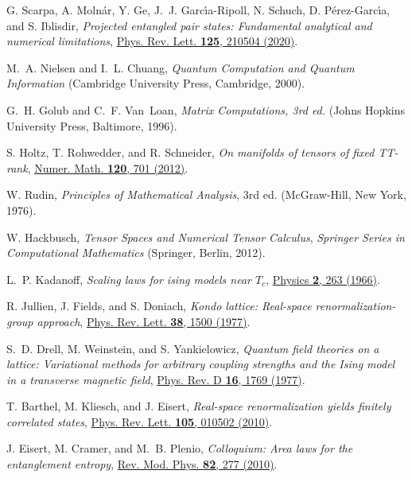 \documentclass[english,11pt,aps,pra,onecolumn,tightenlines,groupedaddress,superscriptaddress,notitlepage,floatfix,fleqn]{revtex4-1}
\begin{document}
\begin{thebibliography}{10}
G. Scarpa, A. Moln\'ar, Y. Ge, J.~J. Garc\'{\i}a-Ripoll, N. Schuch, D.
  P\'erez-Garc\'{\i}a, and S. Iblisdir, {\em Projected entangled pair states:
  Fundamental analytical and numerical limitations},
  \href{https://doi.org/10.1103/PhysRevLett.125.210504} {Phys. Rev. Lett. {\bf
  125},  210504  (2020)}.

M.~A. Nielsen and I.~L. Chuang, {\em Quantum Computation and Quantum
  Information} ({Cambridge University Press}, Cambridge, 2000).

G.~H. Golub and C.~F. Van~Loan, {\em Matrix Computations, 3rd ed.} (Johns
  Hopkins University Press, Baltimore, 1996).

S. Holtz, T. Rohwedder, and R. Schneider, {\em On manifolds of tensors of fixed
  TT-rank}, \href{https://doi.org/10.1007/s00211-011-0419-7} {Numer. Math. {\bf
  120},  701  (2012)}.

W. Rudin, {\em Principles of Mathematical Analysis}, 3rd ed. (McGraw-Hill, New
  York, 1976).

W. Hackbusch, {\em Tensor Spaces and Numerical Tensor Calculus}, {\em Springer
  Series in Computational Mathematics} (Springer, Berlin, 2012).

L.~P. Kadanoff, {\em Scaling laws for ising models near ${T}_{c}$},
  \href{https://doi.org/10.1103/PhysicsPhysiqueFizika.2.263} {Physics {\bf 2},
  263  (1966)}.

R. Jullien, J. Fields, and S. Doniach, {\em Kondo lattice: Real-space
  renormalization-group approach},
  \href{https://doi.org/10.1103/PhysRevLett.38.1500} {Phys. Rev. Lett. {\bf
  38},  1500  (1977)}.

S.~D. Drell, M. Weinstein, and S. Yankielowicz, {\em Quantum field theories on
  a lattice: Variational methods for arbitrary coupling strengths and the Ising
  model in a transverse magnetic field},
  \href{https://doi.org/10.1103/PhysRevD.16.1769} {Phys. Rev. D {\bf 16},  1769
   (1977)}.

T. Barthel, M. Kliesch, and J. Eisert, {\em Real-space renormalization yields
  finitely correlated states},
  \href{https://doi.org/10.1103/PhysRevLett.105.010502} {Phys. Rev. Lett. {\bf
  105},  010502  (2010)}.

J. Eisert, M. Cramer, and M.~B. Plenio, {\em Colloquium: Area laws for the
  entanglement entropy}, \href{https://doi.org/10.1103/RevModPhys.82.277} {Rev.
  Mod. Phys. {\bf 82},  277  (2010)}.


\end{thebibliography}
\end{document}
